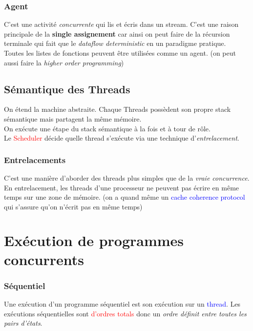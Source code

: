 \documentclass{report}
\begin{document}
\subsubsection{Agent}
C'est une activité \textit{concurrente} qui lis et écris dans un stream. C'est une raison principale de la \textbf{single assignement} car ainsi on peut faire de la récursion terminale qui fait que le \textit{dataflow deterministic} en un paradigme pratique.\\
Toutes les listes de fonctions peuvent être utilisées comme un agent. (on peut aussi faire la \textit{higher order programming})

\subsection{Sémantique des Threads}
On étend la machine abstraite. Chaque Threads possèdent son propre stack sémantique mais partagent la même mémoire.\\
On exécute une étape du stack sémantique à la fois et à tour de rôle.\\
Le \textcolor{red}{Scheduler} décide quelle thread s'exécute via une technique d'\textit{entrelacement}.

\subsubsection{Entrelacements}
C'est une manière d'aborder des threads plus simples que de la \textit{vraie concurrence}. En entrelacement, les threads d'une processeur ne peuvent pas écrire en même temps sur une zone de mémoire. (on a quand même un \textcolor{blue}{cache coherence protocol} qui s'assure qu'on n'écrit pas en même temps)

\section{Exécution de programmes concurrents}

\subsubsection{Séquentiel}
Une exécution d'un programme séquentiel est son exécution sur un \textcolor{blue}{thread}. Les exécutions séquentielles sont \textcolor{red}{d'ordres totals} donc un \textit{ordre définit entre toutes les pairs d'états}.
\end{document}
